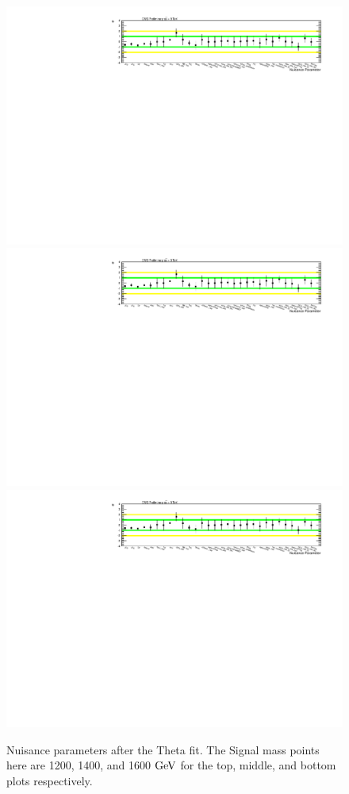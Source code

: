 \begin{figure}
\centering
\includegraphics[width=1.0\textwidth]{AN-14-049/figs/nuisancerightbs1200.pdf}\\
\includegraphics[width=1.0\textwidth]{AN-14-049/figs/nuisancerightbs1400.pdf}\\
\includegraphics[width=1.0\textwidth]{AN-14-049/figs/nuisancerightbs1600.pdf}\\
\caption{Nuisance parameters after the Theta fit.  The Signal mass points here are 1200, 1400, and 1600 $\mathrm{GeV}$ for the top, middle, and bottom plots respectively.}
\label{figs:bsnuisance}
\end{figure}

